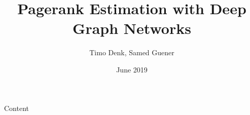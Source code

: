 \documentclass{article}
\title{Pagerank Estimation with Deep Graph Networks}
\author{Timo Denk, Samed Guener}
\date{June 2019}
\begin{document}
\maketitle

Content
\end{document}
